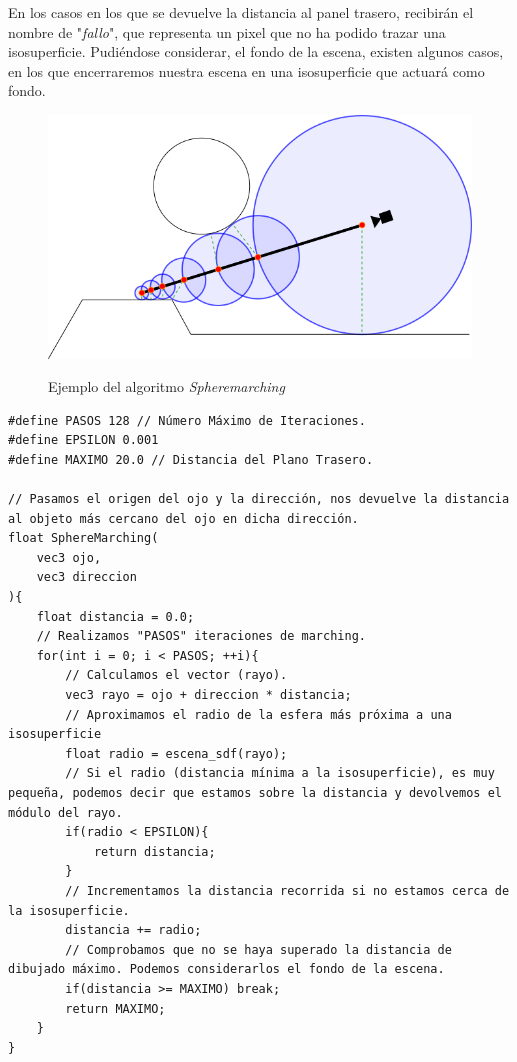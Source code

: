  En los casos en los que se devuelve la distancia al panel trasero, recibirán el nombre de "\textit{fallo}", que representa un pixel que no ha podido trazar una isosuperficie. Pudiéndose considerar, el fondo de la escena, existen algunos casos, en los que encerraremos nuestra escena en una isosuperficie que actuará como fondo.
\begin{figure}[H]
  \centering
  \captionsetup{justification=centering}%
  \includegraphics[width=1.0\textwidth]{secciones/imagenes/raymarching.png}\label{fig:spheremarcher}
  \caption{Ejemplo del algoritmo \textit{Spheremarching}}
\end{figure}
\newpage
\begin{lstlisting}
#define PASOS 128 // Número Máximo de Iteraciones.
#define EPSILON 0.001
#define MAXIMO 20.0 // Distancia del Plano Trasero.

// Pasamos el origen del ojo y la dirección, nos devuelve la distancia al objeto más cercano del ojo en dicha dirección.
float SphereMarching(
    vec3 ojo, 
    vec3 direccion
){
    float distancia = 0.0;
    // Realizamos "PASOS" iteraciones de marching.
    for(int i = 0; i < PASOS; ++i){
        // Calculamos el vector (rayo).
        vec3 rayo = ojo + direccion * distancia;
        // Aproximamos el radio de la esfera más próxima a una isosuperficie
        float radio = escena_sdf(rayo);
        // Si el radio (distancia mínima a la isosuperficie), es muy pequeña, podemos decir que estamos sobre la distancia y devolvemos el módulo del rayo.
        if(radio < EPSILON){
            return distancia;
        }
        // Incrementamos la distancia recorrida si no estamos cerca de la isosuperficie.
        distancia += radio;
        // Comprobamos que no se haya superado la distancia de dibujado máximo. Podemos considerarlos el fondo de la escena.
        if(distancia >= MAXIMO) break;
        return MAXIMO;
    }
}
\end{lstlisting}
